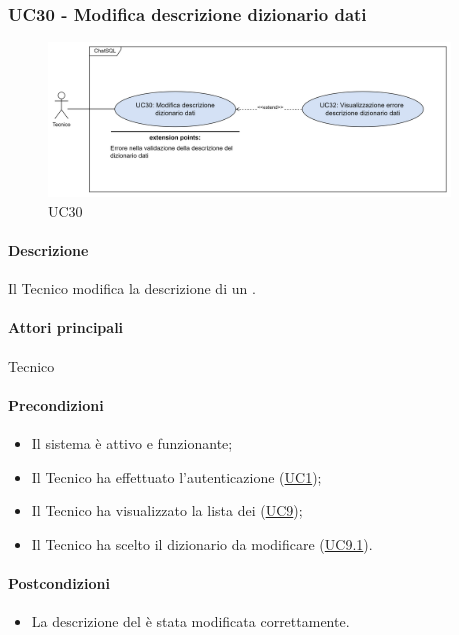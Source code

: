 \subsubsection{UC30 - Modifica descrizione dizionario dati}\label{UC30}

\begin{figure}[H]
  \centering
  \includegraphics[width=0.95\textwidth]{assets/uc30.png}
  \caption{UC30}
\end{figure}

\paragraph*{Descrizione}
Il Tecnico modifica la descrizione di un .

\paragraph*{Attori principali}
Tecnico

\paragraph*{Precondizioni}
\begin{itemize}
  \item Il sistema è attivo e funzionante;
  \item Il Tecnico ha effettuato l'autenticazione (\hyperref[UC1]{UC1});
  \item Il Tecnico ha visualizzato la lista dei  (\hyperref[UC9]{UC9});
  \item Il Tecnico ha scelto il dizionario da modificare (\hyperref[UC9.1]{UC9.1}).
\end{itemize}

\paragraph*{Postcondizioni}
\begin{itemize}
  \item La descrizione del  è stata modificata correttamente.
\end{itemize}

